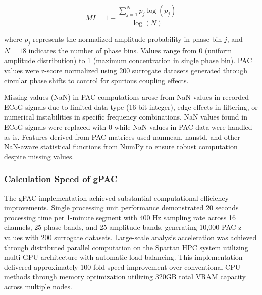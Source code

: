 \begin{equation}
MI = 1 + \frac{\sum_{j=1}^{N} p_j \log(p_j)}{\log(N)}
\end{equation}

where $p_j$ represents the normalized amplitude probability in phase bin $j$, and $N = 18$ indicates the number of phase bins. Values range from 0 (uniform amplitude distribution) to 1 (maximum concentration in single phase bin). PAC values were z-score normalized using 200 surrogate datasets generated through circular phase shifts to control for spurious coupling effects.

	Missing values (NaN) in PAC computations arose from NaN values in recorded ECoG signals due to limited data type (16 bit integer), edge effects in filtering, or numerical instabilities in specific frequency combinations. NaN values found in ECoG signals were replaced with 0 while NaN values in PAC data were handled as is. Features derived from PAC matrices used nanmean, nanstd, and other NaN-aware statistical functions from NumPy to ensure robust computation despite missing values.

\subsubsection{Calculation Speed of gPAC}

The gPAC implementation achieved substantial computational efficiency improvements. Single processing unit performance demonstrated 20 seconds processing time per 1-minute segment with 400 Hz sampling rate across 16 channels, 25 phase bands, and 25 amplitude bands, generating 10,000 PAC z-values with 200 surrogate datasets. Large-scale analysis acceleration was achieved through distributed parallel computation on the Spartan HPC system utilizing multi-GPU architecture with automatic load balancing. This implementation delivered approximately 100-fold speed improvement over conventional CPU methods through memory optimization utilizing 320GB total VRAM capacity across multiple nodes.




